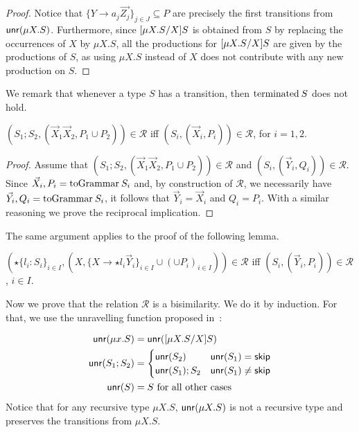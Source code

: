\begin{proof}
	Notice that $\{Y \rightarrow a_j \vec {Z_j}\}_{j\in J}\subseteq P$ are 
	precisely the first 
	transitions from $\mathsf{unr}(\mu X.S)$. Furthermore, since 
	$[{\mu X.S}/{X}] S$ is obtained from $S$ by 
	replacing the occurrences of $X$ by $\mu X.S$, all the productions for
	$[{\mu X.S}/{X}] S$ 
	are given by the productions of $S$, as using $\mu X.S$
	instead of $X$ does not contribute with any new production on $S$.
\end{proof}

We remark that whenever a type $S$ has a transition, then $\isCheckedf S$
does not hold.

\begin{lemma}
\label{lemma:bisim_semi}
	$(S_1;S_2, (\vec X_1\vec X_2,  P_1 \cup  P_2))\in\mathcal{R}$ iff 
	$(S_i, (\vec X_i,  P_i))\in\mathcal{R}$, for $i=1,2$.
\end{lemma}
\begin{proof}
	Assume that $(S_1;S_2, (\vec X_1\vec X_2,  P_1 \cup  P_2))\in\mathcal{R}$
	and $(S_i, (\vec Y_i,  Q_i))\in\mathcal{R}$. Since 
	$ \vec X_i, P_i = \toGrammarf{S_i}$ and, by construction of $\mathcal{R}$,
	we necessarily have $ \vec Y_i, Q_i = \toGrammarf{S_i}$, it follows that
	$\vec Y_i = \vec X_i$ and $Q_i=P_i$. With a similar reasoning we prove the
	reciprocal implication.
\end{proof}

The same argument applies to the proof of the following lemma.

\begin{lemma}
\label{lemma:bisim_choice}
	$(\star\{l_i\colon S_i\}_{i\in I}, (X, \{X \rightarrow \star l_i
    \vec Y_i\}_{i\in I} \cup (\cup  P_i)_{i\in I}))\in\mathcal{R}$ iff 
	$(S_i, (\vec Y_i,  P_i))\in\mathcal{R}$, $i \in I$.
\end{lemma}

Now we prove that the relation $\mathcal{R}$ is a bisimilarity. We do it
by induction. For that, we use the unravelling function proposed 
in~\cite{thiemann2016context}:

\[\begin{aligned}
\mathsf{unr}(\mu x . S) &= \mathsf{unr}([{\mu X.S}/{X}] S)\\
\mathsf{unr}(S_1;S_2) &= 
\begin{cases}
	\mathsf{unr}(S_2) & \mathsf{unr}(S_1)=\mathsf{skip}\\
	\mathsf{unr}(S_1);S_2 & \mathsf{unr}(S_1)\neq\mathsf{skip}\\
\end{cases} \\
\mathsf{unr}(S)&= S \text{  for all other cases}
\end{aligned}\]
%
Notice that for any recursive type 
$\mu X.S$, $\mathsf{unr}(\mu X.S)$ is not a recursive type and preserves the 
transitions from $\mu X.S$.

